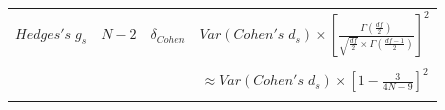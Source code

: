 \documentclass[
  man,floatsintext]{apa6}
\begin{document}
\begin{landscape}
\begin{longtable}[]{@{}lccc@{}}
\begin{minipage}[t]{0.12\columnwidth}\raggedright
\(Hedges's \; g_s\)\strut
\end{minipage} & \begin{minipage}[t]{0.11\columnwidth}\centering
\(N-2\)\strut
\end{minipage} & \begin{minipage}[t]{0.24\columnwidth}\centering
\(\delta_{Cohen}\)\strut
\end{minipage} & \begin{minipage}[t]{0.42\columnwidth}\centering
\(Var(Cohen's \; d_s) \times \left[ \frac{\Gamma(\frac{df}{2})}{\sqrt{\frac{df}{2}} \times \Gamma(\frac{df-1}{2})} \right]^2\)\strut
\end{minipage}\tabularnewline
\begin{minipage}[t]{0.12\columnwidth}\raggedright
\strut
\end{minipage} & \begin{minipage}[t]{0.11\columnwidth}\centering
\strut
\end{minipage} & \begin{minipage}[t]{0.24\columnwidth}\centering
\strut
\end{minipage} & \begin{minipage}[t]{0.42\columnwidth}\centering
\strut
\end{minipage}\tabularnewline
\begin{minipage}[t]{0.12\columnwidth}\raggedright
\strut
\end{minipage} & \begin{minipage}[t]{0.11\columnwidth}\centering
\strut
\end{minipage} & \begin{minipage}[t]{0.24\columnwidth}\centering
\strut
\end{minipage} & \begin{minipage}[t]{0.42\columnwidth}\centering
\(\approx Var(Cohen's \; d_s) \times \left[1-\frac{3}{4N-9}\right]^2\)\strut
\end{minipage}\tabularnewline
\begin{minipage}[t]{0.12\columnwidth}\raggedright
\strut
\end{minipage} & \begin{minipage}[t]{0.11\columnwidth}\centering
\strut
\end{minipage} & \begin{minipage}[t]{0.24\columnwidth}\centering
\strut
\end{minipage} & \begin{minipage}[t]{0.42\columnwidth}\centering
\strut
\end{minipage}\tabularnewline
\bottomrule
\end{longtable}


\end{landscape}
\end{document}
